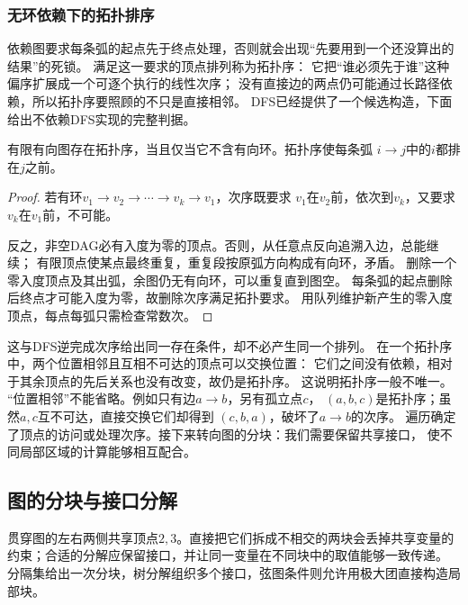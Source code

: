 \subsubsection{无环依赖下的拓扑排序}
\label{sec:graph-theory-topological-order}

依赖图要求每条弧的起点先于终点处理，否则就会出现“先要用到一个还没算出的结果”的死锁。
满足这一要求的顶点排列称为拓扑序：
它把“谁必须先于谁”这种偏序扩展成一个可逐个执行的线性次序；
没有直接边的两点仍可能通过长路径依赖，所以拓扑序要照顾的不只是直接相邻。
DFS已经提供了一个候选构造，下面给出不依赖DFS实现的完整判据。

\begin{theorem}[DAG的拓扑排序]
  \label{thm:graph-theory-topological-order}
  有限有向图存在拓扑序，当且仅当它不含有向环。拓扑序使每条弧
  \(i\to j\)中的\(i\)都排在\(j\)之前。
\end{theorem}

\begin{proof}
若有环\(v_1\to v_2\to\cdots\to v_k\to v_1\)，次序既要求
\(v_1\)在\(v_2\)前，依次到\(v_k\)，又要求\(v_k\)在\(v_1\)前，不可能。

反之，非空DAG必有入度为零的顶点。否则，从任意点反向追溯入边，总能继续；
有限顶点使某点最终重复，重复段按原弧方向构成有向环，矛盾。
删除一个零入度顶点及其出弧，余图仍无有向环，可以重复直到图空。
每条弧的起点删除后终点才可能入度为零，故删除次序满足拓扑要求。
用队列维护新产生的零入度顶点，每点每弧只需检查常数次。
\end{proof}

这与DFS逆完成次序给出同一存在条件，却不必产生同一个排列。
在一个拓扑序中，两个位置相邻且互相不可达的顶点可以交换位置：
它们之间没有依赖，相对于其余顶点的先后关系也没有改变，故仍是拓扑序。
这说明拓扑序一般不唯一。
“位置相邻”不能省略。例如只有边\(a\to b\)，另有孤立点\(c\)，
\((a,b,c)\)是拓扑序；虽然\(a,c\)互不可达，直接交换它们却得到
\((c,b,a)\)，破坏了\(a\to b\)的次序。
遍历确定了顶点的访问或处理次序。接下来转向图的分块：我们需要保留共享接口，
使不同局部区域的计算能够相互配合。

\subsection{图的分块与接口分解}

贯穿图的左右两侧共享顶点\(2,3\)。直接把它们拆成不相交的两块会丢掉共享变量的
约束；合适的分解应保留接口，并让同一变量在不同块中的取值能够一致传递。
分隔集给出一次分块，树分解组织多个接口，弦图条件则允许用极大团直接构造局部块。

